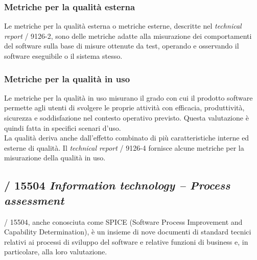  \subsubsection{Metriche per la qualità esterna}
    Le metriche per la qualità esterna o metriche esterne, descritte nel \emph{technical report} / 9126-2,
    sono delle metriche adatte alla misurazione dei comportamenti del software sulla base di misure ottenute da test, operando e osservando il software eseguibile o il sistema stesso.\\

  \subsubsection{Metriche per la qualità in uso}
    Le metriche per la qualità in uso misurano il grado con cui il prodotto software permette agli utenti di svolgere le proprie attività con efficacia, produttività, sicurezza e soddisfazione nel contesto operativo previsto.
    Questa valutazione è quindi fatta in specifici scenari d'uso.\\
    La qualità deriva anche dall'effetto combinato di più caratteristiche interne ed esterne di qualità.
    Il \emph{technical report} / 9126-4 fornisce alcune metriche per la misurazione della qualità in uso.\\


  \subsection{/ 15504 \emph{Information technology – Process assessment}}

  / 15504, anche conosciuta come SPICE (Software Process Improvement and Capability Determination),
  è un insieme di nove documenti di standard tecnici relativi ai processi di sviluppo del software e relative funzioni di business e, in particolare, alla loro valutazione.

